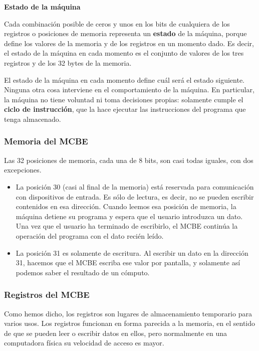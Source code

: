 \documentclass[spanish,a4paper,]{article}
\providecommand{\tightlist}{%
  \setlength{\itemsep}{0pt}\setlength{\parskip}{0pt}}
\begin{document}
\textbf{Estado de la máquina}

Cada combinación posible de ceros y unos en los bits de cualquiera de
los registros o posiciones de memoria representa un \textbf{estado} de
la máquina, porque define los valores de la memoria y de los registros
en un momento dado. Es decir, el estado de la máquina en cada momento es
el conjunto de valores de los tres registros y de los 32 bytes de la
memoria.

El estado de la máquina en cada momento define cuál será el estado
siguiente. Ninguna otra cosa interviene en el comportamiento de la
máquina. En particular, la máquina no tiene voluntad ni toma decisiones
propias: solamente cumple el \textbf{ciclo de instrucción}, que la hace
ejecutar las instrucciones del programa que tenga almacenado.

\hypertarget{memoria-del-mcbe}{%
\subsubsection{Memoria del MCBE}\label{memoria-del-mcbe}}

Las 32 posiciones de memoria, cada una de 8 bits, son casi todas
iguales, con dos excepciones.

\begin{itemize}
\tightlist
\item
  La posición 30 (casi al final de la memoria) está reservada para
  comunicación con dispositivos de entrada. Es sólo de lectura, es
  decir, no se pueden escribir contenidos en esa dirección. Cuando
  leemos esa posición de memoria, la máquina detiene su programa y
  espera que el usuario introduzca un dato. Una vez que el usuario ha
  terminado de escribirlo, el MCBE continúa la operación del programa
  con el dato recién leído.
\item
  La posición 31 es solamente de escritura. Al escribir un dato en la
  dirección 31, hacemos que el MCBE escriba ese valor por pantalla, y
  solamente así podemos saber el resultado de un cómputo.
\end{itemize}

\hypertarget{registros-del-mcbe}{%
\subsubsection{Registros del MCBE}\label{registros-del-mcbe}}

Como hemos dicho, los registros son lugares de almacenamiento temporario
para varios usos. Los registros funcionan en forma parecida a la
memoria, en el sentido de que se pueden leer o escribir datos en ellos,
pero normalmente en una computadora física su velocidad de acceso es
mayor.
\end{document}
